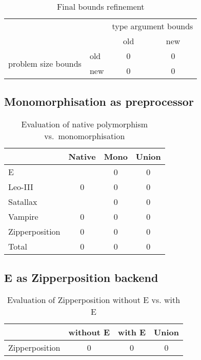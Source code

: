 \documentclass[]{ceurart}
\begin{document}
\begin{table}[ht]
\caption{Final bounds refinement}
\centering\begin{tabular}{@{}llcc@{}}
   \toprule
   && \multicolumn{2}{c}{type argument bounds} \\
   && old & new\\
   \cmidrule(r){3-4}
   \multirow{2}{5.4em}{problem size bounds}
   &\multicolumn{1}{l}{old} & 0  & 0 \\
   &\multicolumn{1}{l}{new} & 0  & 0 \\
   \bottomrule
\end{tabular}
\end{table}

\subsection{Monomorphisation as preprocessor}

\begin{table}[ht]
\caption{Evaluation of native polymorphism vs.\ monomorphisation}
\centering\begin{tabular}{@{}lccc@{}}
   \toprule
   & Native & Mono & Union \\
   \midrule
   E  &   & 0 & 0 \\
   Leo-III & 0 & 0 & 0 \\
   Satallax &  & 0 & 0 \\
   Vampire & 0 & 0 & 0 \\
   Zipperposition & 0 & 0 & 0 \\[1.5\jot]
   Total & 0 & 0 & 0 \\
   \bottomrule
\end{tabular}
\end{table}

\subsection{E as Zipperposition backend}

\begin{table}[ht]
\caption{Evaluation of Zipperposition without E vs. with E}
\centering\begin{tabular}{@{}lccc@{}}
   \toprule
   & without E & with E & Union \\
   \midrule
   Zipperposition & 0 & 0 & 0 \\
   \bottomrule
\end{tabular}
\end{table}

\break
\end{document}
